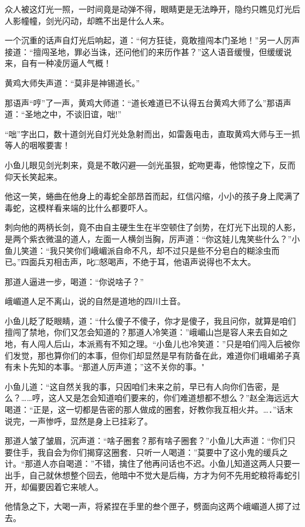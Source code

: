 \documentclass[12pt,oneside]{book}
\begin{document}
众人被这灯光一照，一时间竟是动弹不得，眼睛更是无法睁开，隐约只瞧见灯光后人影幢幢，剑光闪动，却瞧不出是什么人来。

一个沉重的话声自灯光后响起，道：``何方狂徒，竟敢擅闯本门圣地！''另一人厉声接道：``擅闯圣地，罪必当诛，还问他们的来历作甚？''这人语音缓慢，但缓缓说来，自有一种凌厉逼人气概！

黄鸡大师失声道：``莫非是神锡道长。''

那语声``哼''了一声，黄鸡大师道：``道长难道已不认得五台黄鸡大师了么''那语声道：``圣地之中，不谈旧谊，咄!''

``咄''字出口，数十道剑光自灯光处急射而出，如雷轰电击，直取黄鸡大师与王一抓等人的咽喉要害！

小鱼儿眼见剑光刺来，竟是不敢闪避──剑光虽狠，蛇吻更毒，他惊惶之下，反而仰天长笑起来。

他这一笑，蜷曲在他身上的毒蛇全部昂首而起，红信闪缩，小小的孩子身上爬满了毒蛇，这模样看来端的比什么都要吓人。

刺向他的两柄长剑，竟不由自主硬生生在半空顿住了剑势，在灯光下出现的人影，是两个紫衣微温的道人，左面一人横剑当胸，厉声道：``你这娃儿鬼笑些什么？''小鱼儿笑道：``我只笑你们峨嵋派自命不凡，却不过只是些不分皂白的糊涂虫而已。''四面兵刃相击声，叱□怒喝声，不绝于耳，他语声说得也不太大。

那道人逼进一步，喝道：``你说啥子？''

峨嵋道人足不离山，说的自然是道地的四川土音。

小鱼儿眨了眨眼睛，道：``什么傻子不傻子，你才是傻子，我且问你，就算是咱们擅闯了禁地，你们又怎会知道的？那道人冷笑道：''峨嵋山岂是容人来去自如之地，有人闯人后山，本派焉有不知之理。``小鱼儿也冷笑道：''只是咱们闯入后被你们发觉，那也算你们的本事，但你们却显然是早有防备在此，难道你们峨嵋弟子真有未卜先知的本事。``那道人厉声道；''这不关你的事。"

小鱼儿道：``这自然关我的事，只因咱们未来之前，早已有人向你们告密，是么？\ldots\ldots 哼，这人又是怎会知道咱们要来的，你们难道想都不想么？''赵全海远远大喝道：``正是，这一切都是告密的那人做成的圈套，好教你我互相火并。\ldots．''话末说完，一声惨呼，显然是身上已挂彩了。

那道人皱了皱眉，沉声道：``啥子圈套？那有啥子圈套？''小鱼儿大声道：``你们只要住手，我自会为你们揭穿这圈套．只听一人喝道：''莫要中了这小鬼的缓兵之计。``那道人亦自喝道：''不错，擒住了他再问话也不迟。小鱼儿知道这两人只要一出手，自己就休想整个回去，他暗中不觉大是后梅，方才为何不先用蛇粮将毒蛇引开，却偏要因着它来唬人。

他情急之下，大喝一声，将紧捏在手里的叁个匣子，劈面向这两个峨嵋道人掷了过去。
\end{document}
